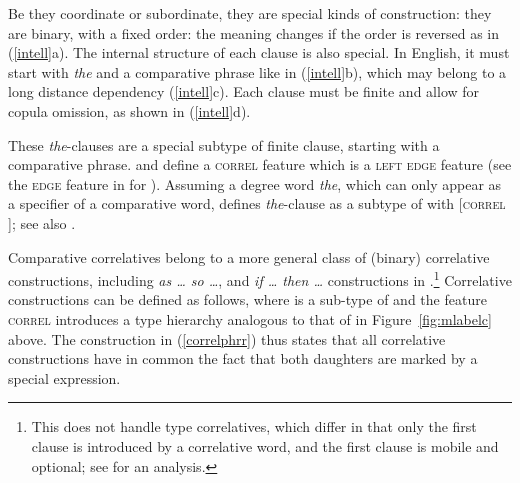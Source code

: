 \documentclass[output=paper
                ,modfonts
                ,nonflat
	        ,collection
	        ,collectionchapter
	        ,collectiontoclongg
 	        ,biblatex
                ,babelshorthands
                ,newtxmath
                ,draftmode
                ,colorlinks, citecolor=brown
]{./langsci/langscibook}
\begin{document}
{Be they coordinate or subordinate, they are special kinds of construction: they are binary, with a fixed order: the meaning changes if the order is reversed
as in (\ref{intell}a).
The internal structure of each clause is also special. In English, it must start with \emph{the} and a comparative phrase like in (\ref{intell}b), which may belong to a long distance dependency 
(\ref{intell}c). Each clause must be finite and allow for copula omission, as shown in (\ref{intell}d).

\begin{exe}
 \ex
\begin{xlista}
\end{xlista}\label{intell}
\end{exe}

These \emph{the}-clauses  are a special subtype of finite clause, starting with a comparative
phrase. \citet[]{Abeille:Borsley:Espinal:06} and \citet[]{Borsley:11} 
define a \textsc{correl} feature which is a \textsc{left edge} feature (see the \textsc{edge}
feature in \citet{Bonami:2004} for  ).
 Assuming a degree word \textit{the}, which can only appear as a specifier of
a comparative word, \citet[]{Borsley:11}  defines \textit{the}-clause as a subtype of  with [\textsc{correl} ]; see also \citet[]{fgsag08}.

Comparative correlatives belong to a more general class of (binary) correlative constructions, including \emph{as \ldots{} so \ldots{}},
and \emph{if \ldots{} then  \ldots{}} constructions in 
\parencites[Section~3.2]{Borsley:04}[--18]{Borsley:11}.\footnote{This does not handle  type correlatives, which differ in that  only the first clause is introduced by a correlative word, and the first clause is mobile and optional; see \citet[228]{pollardsag} for an analysis.}
Correlative constructions can be defined as follows, 
where  is a sub-type of 
 and the feature \textsc{correl} introduces a  type
hierarchy analogous to that of  in Figure~\ref{fig:mlabelc} above.
The construction in (\ref{correlphrr}) thus states that all correlative
constructions have in common the fact that both daughters are marked by a special expression. 

}
\end{document}
